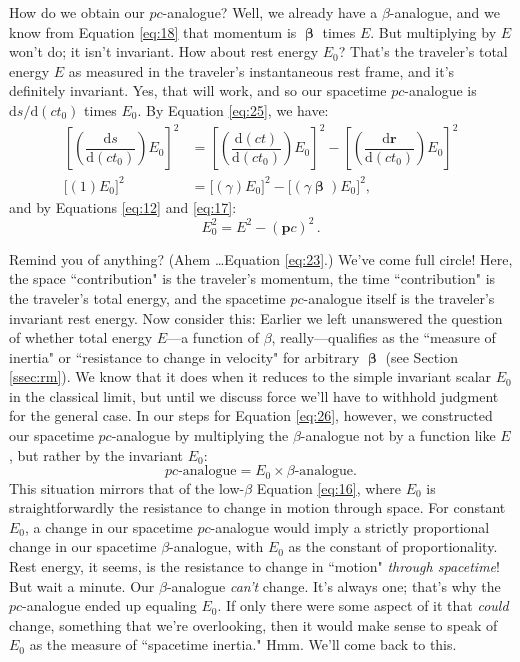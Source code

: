\documentclass[12pt]{article}
\renewcommand{\vv}[1]{\mathbf{#1}}
\newcommand{\dd}[1]{\mathrm{d}#1}
\newcommand{\vvbeta}{\bm{\upbeta}}
\begin{document}
How do we obtain our $p c$-analogue? Well, we already have a $\beta$-analogue, and we know from Equation \ref{eq:18} that momentum is $\vvbeta$ times $E$. But multiplying by $E$ won't do; it isn't invariant. How about rest energy $E_0$? That's the traveler's total energy $E$ as measured in the traveler's instantaneous rest frame, and it's definitely invariant. Yes, that will work, and so our spacetime $p c$-analogue is $\dd s/\dd (c t_0)$ times $E_0$. By Equation \ref{eq:25}, we have:
\begin{equation*}
\begin{split}
\left[ \left( \dfrac{\dd s}{\dd (c t_0)} \right) E_0 \right]^2 &= \left[ \left( \dfrac{\dd (ct)}{\dd (c t_0)} \right) E_0\right]^2 - \left[ \left( \dfrac{\dd \vv r}{\dd (c t_0)} \right)E_0\right]^2 \\[5pt]
\bigl[ (1)E_0 \bigr]^2 &=  \bigl[ (\gamma) E_0 \bigr] ^2 - \bigl[ (\gamma \bm{\upbeta}) E_0 \bigr] ^2 ,
\end{split}
\end{equation*}
and by Equations \ref{eq:12} and \ref{eq:17}:
\begin{equation}\label{eq:26}
\boxed{E_0^2 = E^2 - (\vv p c)^2} \, .
\end{equation}

Remind you of anything? (Ahem \dots Equation \ref{eq:23}.) We've come full circle! Here, the space ``contribution" is the traveler's momentum, the time ``contribution" is the traveler's total energy, and the spacetime $p c$-analogue itself is the traveler's invariant rest energy. Now consider this: Earlier we left unanswered the question of whether total energy $E$---a function of $\beta$, really---qualifies as the ``measure of inertia" or ``resistance to change in velocity" for arbitrary $\vvbeta$ (see Section \ref{ssec:rm}). We know that it does when it reduces to the simple invariant scalar $E_0$ in the classical limit, but until we discuss force we'll have to withhold judgment for the general case. In our steps for Equation \ref{eq:26}, however, we constructed our spacetime $p c$-analogue by multiplying the $\beta$-analogue not by a function like $E$, but rather by the invariant $E_0$:
\begin{equation*}
p c \textrm{-analogue} = E_0 \times \beta \textrm{-analogue}.
\end{equation*}
This situation mirrors that of the low-$\beta$ Equation \ref{eq:16}, where $E_0$ is straightforwardly the resistance to change in motion through space. For constant $E_0$, a change in our spacetime $p c$-analogue would imply a strictly proportional change in our spacetime $\beta$-analogue, with $E_0$ as the constant of proportionality. Rest energy, it seems, is the resistance to change in ``motion" \emph{through spacetime}! But wait a minute. Our $\beta$-analogue \emph{can't} change. It's always one; that's why the $p c$-analogue ended up equaling $E_0$. If only there were some aspect of it that \emph{could} change, something that we're overlooking, then it would make sense to speak of $E_0$ as the measure of ``spacetime inertia." Hmm. We'll come back to this.
\end{document}
